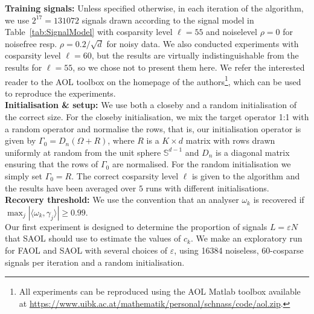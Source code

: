 \documentclass[11pt, onecolumn, journal,compsoc]{IEEEtran}
\newcommand\ip[2]{\langle #1, #2\rangle}
\newcommand\eps{\varepsilon}
\renewcommand{\S}{\mathbb{S}}
\theoremstyle{plain}
\theoremstyle{remark}
\begin{document}
%
{\bf Training signals:} Unless specified otherwise, in each iteration of the algorithm, we use $2^{17} = 131072$ signals drawn according to the signal model in Table~\ref{tab:SignalModel} with cosparsity level $\ell= 55$ and noiselevel $\rho = 0$ for noisefree resp. $\rho =0.2/\sqrt{d}$ for noisy data. We also conducted experiments with cosparsity level $\ell = 60$, but the results are virtually indistinguishable from the results for $\ell = 55$, so we chose not to present them here. We refer the interested reader to the AOL toolbox on the homepage of the authors\footnote{All experiments can be reproduced using the AOL Matlab toolbox available at \url{https://www.uibk.ac.at/mathematik/personal/schnass/code/aol.zip}.}, which can be used to reproduce the experiments.\\
%
{\bf Initialisation \& setup:} We use both a closeby and a random initialisation of the correct size. For the closeby initialisation, we mix the target operator 1:1 with a random operator and normalise the rows, that is, our initialisation operator is given by $\Gamma_0 = D_n (\Omega + R)$, where $R$ is a $K\times d$ matrix with rows drawn uniformly at random from the unit sphere $\S^{d-1}$ and $D_n$ is a diagonal matrix ensuring that the rows of $\Gamma_0$ are normalised. For the random initialisation we simply set $\Gamma_0 = R$. The correct cosparsity level $\ell$ is given to the algorithm and the results have been averaged over $5$ runs with different initialisations.\\
%
{\bf Recovery threshold:} We use the convention that an analyser $\omega_k$ is recovered if $\max_j|\ip{\omega_k}{\gamma_j}|\geq 0.99$.\\
%
Our first experiment is designed to determine the proportion of signals $L =\eps N$ that SAOL should use to estimate the values of $c_k$. We make an exploratory run for FAOL and SAOL with several choices of $\eps$, using 16384 noiseless, 60-cosparse signals per iteration and a random initialisation.
\end{document}
